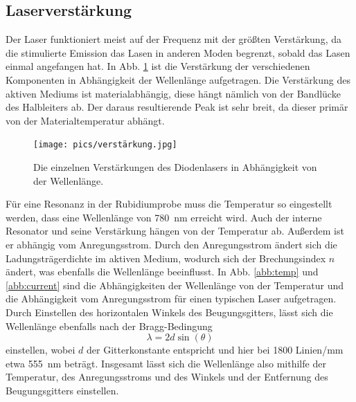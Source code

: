\subsection{Laserverstärkung}

Der Laser funktioniert meist auf der Frequenz mit der größten Verstärkung, da die stimulierte Emission das Lasen in anderen Moden begrenzt, sobald das Lasen einmal angefangen hat.
In Abb. \ref{abb:verstärker} ist die Verstärkung der verschiedenen Komponenten in Abhängigkeit der Wellenlänge aufgetragen. Die Verstärkung des aktiven Mediums ist materialabhängig, diese hängt nämlich von der Bandlücke des Halbleiters ab. Der daraus resultierende Peak ist sehr breit, da dieser primär von der Materialtemperatur abhängt.

\begin{figure}
    \centering
    \texttt{[image: pics/verstärkung.jpg]}
    \caption{Die einzelnen Verstärkungen des Diodenlasers in Abhängigkeit von der Wellenlänge. \cite{anleitung}}
    \label{abb:verstärker}
\end{figure}

Für eine Resonanz in der Rubidiumprobe muss die Temperatur so eingestellt werden, dass eine Wellenlänge von \SI{780}{\nm} erreicht wird. Auch der interne Resonator und seine Verstärkung hängen von der Temperatur ab. Außerdem ist er abhängig vom Anregungsstrom. Durch den Anregungsstrom ändert sich die Ladungsträgerdichte im aktiven Medium, wodurch sich der Brechungsindex $n$ ändert, was ebenfalls die Wellenlänge beeinflusst. In Abb. \ref{abb:temp} und \ref{abb:current} sind die Abhängigkeiten der Wellenlänge von der Temperatur und die Abhängigkeit vom Anregungsstrom für einen typischen Laser aufgetragen. Durch Einstellen des horizontalen Winkels des Beugungsgitters, lässt sich die Wellenlänge ebenfalls  nach der Bragg-Bedingung
\begin{equation*}
    \lambda = 2d \sin(\theta)
\end{equation*}
einstellen, wobei $d$ der Gitterkonstante entspricht und hier bei 1800 Linien/\si{\mm} etwa \SI{555}{\nm} beträgt. Insgesamt lässt sich die Wellenlänge also mithilfe der Temperatur, des Anregungsstroms und des Winkels und der Entfernung des Beugungsgitters einstellen.

